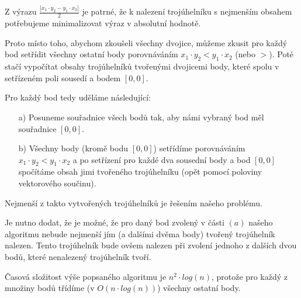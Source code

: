 \documentclass[a4paper, 12pt]{article}
\begin{document}
  Z výrazu $\frac{| x_1 \cdot y_2 - y_1 \cdot x_2 |}{2}$ je patrné, že k nalezení trojúhelníku s nejmenším obsahem potřebujeme minimalizovat výraz v absolutní hodnotě.

  Proto místo toho, abychom zkoušeli všechny dvojice, můžeme zkusit pro každý bod setřídit všechny ostatní body porovnáváním $x_1 \cdot y_2 < y_1 \cdot x_2$ (nebo $>$). Poté stačí vypočítat obsahy trojúhelníků tvořenými dvojicemi body, které spolu v setřízeném poli sousedí a bodem $[0,0]$.

  Pro každý bod tedy uděláme následující:
  \begin{itemize}
    \item[a)] Posuneme souřadnice všech bodů tak, aby námi vybraný bod měl souřadnice $[0,0]$.
    \item[b)] Všechny body (kromě bodu $[0,0]$) setřídíme porovnáváním $x_1 \cdot y_2 < y_1 \cdot x_2$ a po setřízení pro každé dva sousední body a bod $[0,0]$ spočítáme obsah jimi tvořeného trojúhelníku (opět pomocí poloviny vektorového součinu).
  \end{itemize}

  Nejmenší z takto vytvořených trojúhelníků je řešením našeho problému.

  Je nutno dodat, že je možné, že pro daný bod zvolený v části $(a)$ našeho algoritmu nebude nejmenší jím (a dalšími dvěma body) tvořený trojúhelník nalezen. Tento trojúhelník bude ovšem nalezen při zvolení jednoho z dalších dvou bodů, které nenalezený trojúhelník tvoří.

  Časová složitost výše popsaného algoritmu je $n^2 \cdot log(n)$, protože pro každý z množiny bodů třídíme (v $O(n \cdot log(n))$) všechny ostatní body.
\end{document}
